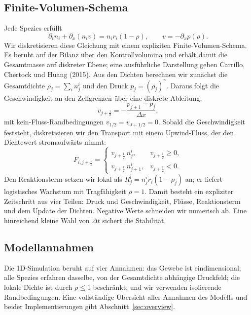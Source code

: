 \documentclass[11pt]{article}
\begin{document}
\subsection{Finite-Volumen-Schema}
\label{sec:fv1d}
Jede Spezies erfüllt
\begin{equation}
    \partial_t n_i + \partial_x (n_i v) = n_i r_i (1 - \rho), \qquad
    v = -\partial_x p(\rho).
\end{equation}
Wir diskretisieren diese Gleichung mit einem expliziten Finite-Volumen-Schema.
Es beruht auf der Bilanz über den Kontrollvolumina und erhält damit die
Gesamtmasse auf diskreter Ebene; eine ausführliche Darstellung geben Carrillo,
Chertock und Huang (2015). Aus den Dichten berechnen wir zunächst die Gesamtdichte
$\rho_j = \sum_i n^{i}_j$ und den Druck $p_j = (\rho_j)^\gamma$. Daraus folgt die
Geschwindigkeit an den Zellgrenzen über eine diskrete Ableitung,
\begin{equation}
    v_{j + \frac{1}{2}} = -\frac{p_{j+1} - p_j}{\Delta x},
\end{equation}
mit kein-Fluss-Randbedingungen $v_{1/2} = v_{J + 1/2} = 0$. Sobald die
Geschwindigkeit feststeht, diskretisieren wir den Transport mit einem
Upwind-Fluss, der den Dichtewert stromaufwärts nimmt:
\begin{equation}
    F_{i, j + \frac{1}{2}} =
    \begin{cases}
        v_{j + \frac{1}{2}}\, n^{i}_j,     & v_{j + \frac{1}{2}} \ge 0, \\[4pt]
        v_{j + \frac{1}{2}}\, n^{i}_{j+1}, & v_{j + \frac{1}{2}} < 0.
    \end{cases}
\end{equation}
Den Reaktionsterm setzen wir lokal als $R^{i}_j = n^{i}_j r_i (1 - \rho_j)$ an; er
liefert logistisches Wachstum mit Tragfähigkeit $\rho = 1$. Damit besteht ein
expliziter Zeitschritt aus vier Teilen: Druck und Geschwindigkeit, Flüsse,
Reaktionsterm und dem Update der Dichten. Negative Werte schneiden wir numerisch
ab. Eine hinreichend kleine Wahl von $\Delta t$ sichert die Stabilität.

\subsection{Modellannahmen}
\label{sec:annahmen1d}
Die 1D-Simulation beruht auf vier Annahmen: das Gewebe ist eindimensional; alle
Spezies erfahren dasselbe, von der Gesamtdichte abhängige Druckfeld; die lokale
Dichte ist durch $\rho \le 1$ beschränkt; und wir verwenden isolierende
Randbedingungen. Eine vollständige Übersicht aller Annahmen des Modells und beider
Implementierungen gibt Abschnitt~\ref{sec:overview}.
\end{document}
